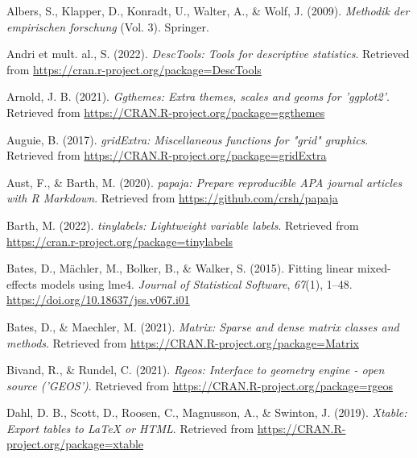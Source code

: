 \documentclass[
  man]{apa6}
\newlength{\cslhangindent}
\newlength{\cslentryspacingunit} %
\newenvironment{CSLReferences}[2] %
 {%
  \setlength{\parindent}{0pt}
  \ifodd #1
  \let\oldpar\par
  \def\par{\hangindent=\cslhangindent\oldpar}
  \fi
  \setlength{\parskip}{#2\cslentryspacingunit}
 }%
 {}
\begin{document}
\hypertarget{refs}{}
\begin{CSLReferences}{1}{0}
\leavevmode{}%
Albers, S., Klapper, D., Konradt, U., Walter, A., \& Wolf, J. (2009). \emph{Methodik der empirischen forschung} (Vol. 3). Springer.

\leavevmode{}%
Andri et mult. al., S. (2022). \emph{{DescTools}: Tools for descriptive statistics}. Retrieved from \url{https://cran.r-project.org/package=DescTools}

\leavevmode{}%
Arnold, J. B. (2021). \emph{Ggthemes: Extra themes, scales and geoms for 'ggplot2'}. Retrieved from \url{https://CRAN.R-project.org/package=ggthemes}

\leavevmode{}%
Auguie, B. (2017). \emph{gridExtra: Miscellaneous functions for "grid" graphics}. Retrieved from \url{https://CRAN.R-project.org/package=gridExtra}

\leavevmode{}%
Aust, F., \& Barth, M. (2020). \emph{{papaja}: {Prepare} reproducible {APA} journal articles with {R Markdown}}. Retrieved from \url{https://github.com/crsh/papaja}

\leavevmode{}%
Barth, M. (2022). \emph{{tinylabels}: Lightweight variable labels}. Retrieved from \url{https://cran.r-project.org/package=tinylabels}

\leavevmode{}%
Bates, D., Mächler, M., Bolker, B., \& Walker, S. (2015). Fitting linear mixed-effects models using {lme4}. \emph{Journal of Statistical Software}, \emph{67}(1), 1--48. \url{https://doi.org/10.18637/jss.v067.i01}

\leavevmode{}%
Bates, D., \& Maechler, M. (2021). \emph{Matrix: Sparse and dense matrix classes and methods}. Retrieved from \url{https://CRAN.R-project.org/package=Matrix}

\leavevmode{}%
Bivand, R., \& Rundel, C. (2021). \emph{Rgeos: Interface to geometry engine - open source ('GEOS')}. Retrieved from \url{https://CRAN.R-project.org/package=rgeos}

\leavevmode{}%
Dahl, D. B., Scott, D., Roosen, C., Magnusson, A., \& Swinton, J. (2019). \emph{Xtable: Export tables to LaTeX or HTML}. Retrieved from \url{https://CRAN.R-project.org/package=xtable}


\end{CSLReferences}
\end{document}

